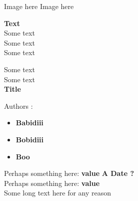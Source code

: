 \begin{titlepage}
    \begin{center}
        \vspace{1cm}
        Image here
        \hfill
        Image here
        \begin{flushright}
            \textbf{Text}\\
            Some text \\
            Some text \\
            Some text
        \end{flushright}
        \vfill	

        Some text\\
        Some text\\
        \vspace{1em}
        { \Large \bfseries Title}
        \vspace{2em}

        \flushleft Authors : 
        \begin{itemize}
          \item \textbf{Babidiii}
          \item \textbf{Bobidiii}
          \item \textbf{Boo}
        \end{itemize}
        \vfill \vfill 
    \end{center}

    \normalsize
    \begin{flushleft}
        Perhaps something here: \textbf{value} \hfill \textbf{A Date ?}\\
        Perhaps something here: \textbf{value} \\
        \vspace{1em}
        Some long text here for any reason
    \end{flushleft}
\end{titlepage}
